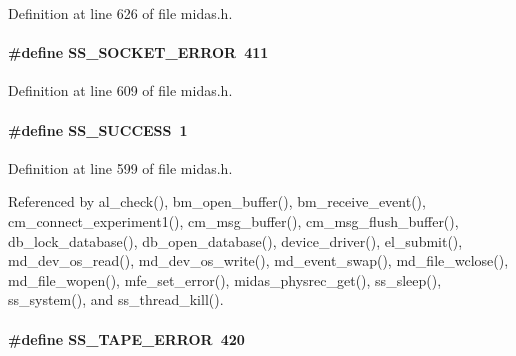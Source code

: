 \begin{DoxyItemize}
\item 
\end{DoxyItemize}

Definition at line 626 of file midas.h.
\paragraph[{SS\_\-SOCKET\_\-ERROR}]{\setlength{\rightskip}{0pt plus 5cm}\#define SS\_\-SOCKET\_\-ERROR~411}\hfill\label{group__err24_gabfc9c001ee2e4f077a312cf4cf820dfe}

\begin{DoxyItemize}
\item 
\end{DoxyItemize}

Definition at line 609 of file midas.h.
\paragraph[{SS\_\-SUCCESS}]{\setlength{\rightskip}{0pt plus 5cm}\#define SS\_\-SUCCESS~1}\hfill\label{group__err24_ga0abac6c68d7a79ce83d1a25b2c800321}

\begin{DoxyItemize}
\item 
\end{DoxyItemize}

Definition at line 599 of file midas.h.

Referenced by al\_\-check(), bm\_\-open\_\-buffer(), bm\_\-receive\_\-event(), cm\_\-connect\_\-experiment1(), cm\_\-msg\_\-buffer(), cm\_\-msg\_\-flush\_\-buffer(), db\_\-lock\_\-database(), db\_\-open\_\-database(), device\_\-driver(), el\_\-submit(), md\_\-dev\_\-os\_\-read(), md\_\-dev\_\-os\_\-write(), md\_\-event\_\-swap(), md\_\-file\_\-wclose(), md\_\-file\_\-wopen(), mfe\_\-set\_\-error(), midas\_\-physrec\_\-get(), ss\_\-sleep(), ss\_\-system(), and ss\_\-thread\_\-kill().
\paragraph[{SS\_\-TAPE\_\-ERROR}]{\setlength{\rightskip}{0pt plus 5cm}\#define SS\_\-TAPE\_\-ERROR~420}\hfill\label{group__err24_ga1271b2092f57a1f2eab374deb5aa20e0}


